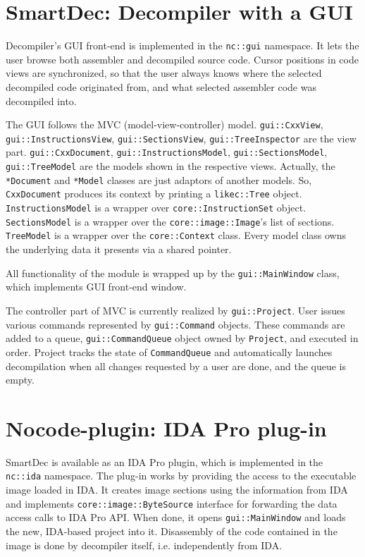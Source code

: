 \documentclass[a4paper,12pt]{article}
\newcommand{\ident}[1]{\texttt{#1}}
\begin{document}
\clearpage
\section{SmartDec: Decompiler with a GUI}

Decompiler's GUI front-end is implemented in the \ident{nc::gui} namespace. It lets the user browse both assembler and decompiled source code. 
Cursor positions in code views are synchronized, so that the user always knows where the selected decompiled code originated from, and what selected assembler code was decompiled into.

The GUI follows the MVC (model-view-controller) model.
\ident{gui::CxxView}, \ident{gui::InstructionsView}, \ident{gui::SectionsView}, \ident{gui::TreeInspector} are the view part.
\ident{gui::CxxDocument}, \ident{gui::InstructionsModel}, \ident{gui::SectionsModel}, \ident{gui::TreeModel} are the models shown in the respective views.
Actually, the \ident{*Document} and \ident{*Model} classes are just adaptors of another models.
So, \ident{CxxDocument} produces its context by printing a \ident{likec::Tree} object.
\ident{InstructionsModel} is a wrapper over \ident{core::InstructionSet} object.
\ident{SectionsModel} is a wrapper over the \ident{core::image::Image}'s list of sections.
\ident{TreeModel} is a wrapper over the \ident{core::Context} class.
Every model class owns the underlying data it presents via a shared pointer.

All functionality of the module is wrapped up by the \ident{gui::MainWindow} class, which implements GUI front-end window.

The controller part of MVC is currently realized by \ident{gui::Project}.
User issues various commands represented by \ident{gui::Command} objects.
These commands are added to a queue, \ident{gui::CommandQueue} object owned by \ident{Project}, and executed in order.
Project tracks the state of \ident{CommandQueue} and automatically launches decompilation when all changes requested by a user are done, and the queue is empty.

\clearpage
\section{Nocode-plugin: IDA Pro plug-in}

SmartDec is available as an IDA Pro plugin, which is implemented in the \ident{nc::ida} namespace. 
The plug-in works by providing the access to the executable image loaded in IDA.
It creates image sections using the information from IDA and implements \ident{core::image::ByteSource} interface for forwarding the data access calls to IDA Pro API.
When done, it opens \ident{gui::MainWindow} and loads the new, IDA-based project into it.
Disassembly of the code contained in the image is done by decompiler itself, i.e. independently from IDA.
\end{document}

